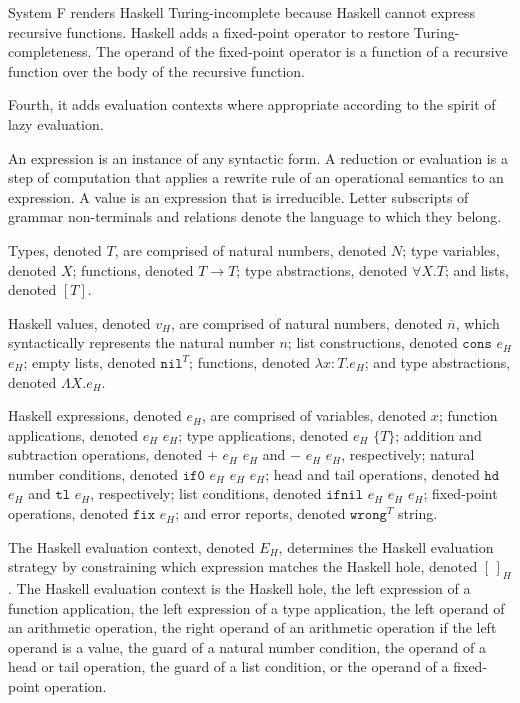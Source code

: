System F renders Haskell Turing-incomplete because Haskell cannot express recursive functions.  Haskell adds a fixed-point operator to restore Turing-completeness.  The operand of the fixed-point operator is a function of a recursive function over the body of the recursive function.

Fourth, it adds evaluation contexts where appropriate according to the spirit of lazy evaluation.

An expression is an instance of any syntactic form.  A reduction or evaluation is a step of computation that applies a rewrite rule of an operational semantics to an expression.  A value is an expression that is irreducible.  Letter subscripts of grammar non-terminals and relations denote the language to which they belong.

Types, denoted $T$, are comprised of natural numbers, denoted $N$; type variables, denoted $X$; functions, denoted $T\rightarrow T$; type abstractions, denoted $\forall X.T$; and lists, denoted $[T]$.

Haskell values, denoted $v_{H}$, are comprised of natural numbers, denoted $\overline{n}$, which syntactically represents the natural number $n$; list constructions, denoted $\mathtt{cons}$ $e_{H}$ $e_{H}$; empty lists, denoted $\mathtt{nil}^{T}$; functions, denoted $\lambda x:T.e_{H}$; and type abstractions, denoted $\Lambda X.e_{H}$.

Haskell expressions, denoted $e_{H}$, are comprised of variables, denoted $x$; function applications, denoted $e_{H}$ $e_{H}$; type applications, denoted $e_{H}$ $\lbrace T\rbrace$; addition and subtraction operations, denoted $+$ $e_{H}$ $e_{H}$ and $-$ $e_{H}$ $e_{H}$, respectively; natural number conditions, denoted $\mathtt{if0}$ $e_{H}$ $e_{H}$ $e_{H}$; head and tail operations, denoted $\mathtt{hd}$ $e_{H}$ and $\mathtt{tl}$ $e_{H}$, respectively; list conditions, denoted $\mathtt{ifnil}$ $e_{H}$ $e_{H}$ $e_{H}$; fixed-point operations, denoted $\mathtt{fix}$ $e_{H}$; and error reports, denoted $\mathtt{wrong}^{T}$ string.

The Haskell evaluation context, denoted $E_{H}$, determines the Haskell evaluation strategy by constraining which expression matches the Haskell hole, denoted $[\,]_{H}$.  The Haskell evaluation context is the Haskell hole, the left expression of a function application, the left expression of a type application, the left operand of an arithmetic operation, the right operand of an arithmetic operation if the left operand is a value, the guard of a natural number condition, the operand of a head or tail operation, the guard of a list condition, or the operand of a fixed-point operation.


